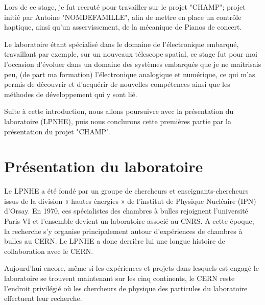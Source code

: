 \documentclass[french,a4paper,12pt]{report}
\begin{document}
Lors de ce stage, je fut recruté pour travailler sur le projet "CHAMP"; projet initié par Antoine "NOMDEFAMILLE", afin de mettre en place un contrôle haptique, ainsi qu'un asservissement, de la mécanique de Pianos de concert.\newline

Le laboratoire étant spécialisé dans le domaine de l'électronique embarqué, travaillant par exemple, sur un nouveaux télescope spatial, ce stage fut pour moi l'occasion d'évoluer dans un domaine des systèmes embarqués que je ne maitrisais peu, (de part ma formation) l'électronique analogique et numérique, ce qui m'as permis de découvrir et d'acquérir de nouvelles compétences ainsi que les méthodes de développement qui y sont lié.\newline

Suite à cette introduction, nous allons poursuivre avec la présentation du laboratoire (LPNHE), puis nous conclurons cette premières partie par la présentation du projet "CHAMP".


  
  \chapter{Présentation du laboratoire}
  Le LPNHE a été fondé par un groupe de chercheurs et enseignants-chercheurs issus de la division « hautes énergies » de l’institut de Physique Nucléaire (IPN) d’Orsay. En 1970, ces spécialistes des chambres à bulles rejoignent l’université Paris VI et l’ensemble devient un laboratoire associé au CNRS. A cette époque, la recherche s’y organise principalement autour d’expériences de chambres à bulles au CERN. Le LPNHE a donc derrière lui une longue histoire de collaboration avec le CERN. 
  
  Aujourd’hui encore, même si les expériences et projets dans lesquels est engagé le laboratoire se trouvent maintenant sur les cinq continents, le CERN reste l’endroit privilégié où les chercheurs de physique des particules du laboratoire effectuent leur recherche.
  
\end{document}
